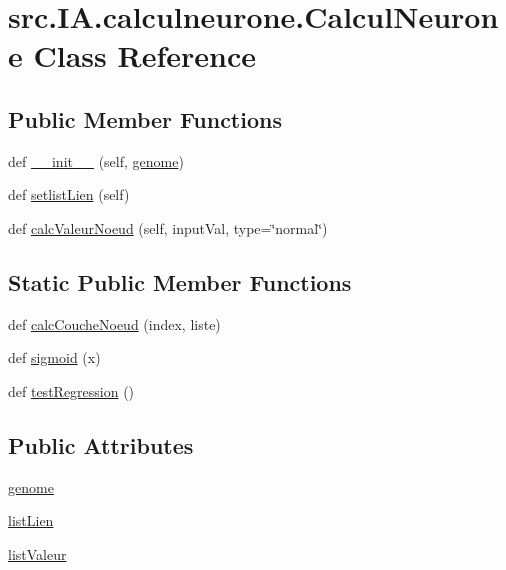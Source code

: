 \hypertarget{classsrc_1_1_i_a_1_1calculneurone_1_1_calcul_neurone}{}\section{src.\+I\+A.\+calculneurone.\+Calcul\+Neurone Class Reference}
\label{classsrc_1_1_i_a_1_1calculneurone_1_1_calcul_neurone}
\subsection*{Public Member Functions}
\begin{DoxyCompactItemize}
\item 
def \hyperlink{classsrc_1_1_i_a_1_1calculneurone_1_1_calcul_neurone_afe5ce9166d3419eb900db1d3a3801ba7}{\+\_\+\+\_\+init\+\_\+\+\_\+} (self, \hyperlink{classsrc_1_1_i_a_1_1calculneurone_1_1_calcul_neurone_a72f88c170dedc7b9fff3200986e5dafc}{genome})
\item 
def \hyperlink{classsrc_1_1_i_a_1_1calculneurone_1_1_calcul_neurone_a5a2eac40e09b30ac192f13c5486c54ad}{setlist\+Lien} (self)
\item 
def \hyperlink{classsrc_1_1_i_a_1_1calculneurone_1_1_calcul_neurone_a7d2ad74e3b969f02d7950313221fbe4a}{calc\+Valeur\+Noeud} (self, input\+Val, type=\char`\"{}normal\char`\"{})
\end{DoxyCompactItemize}
\subsection*{Static Public Member Functions}
\begin{DoxyCompactItemize}
\item 
def \hyperlink{classsrc_1_1_i_a_1_1calculneurone_1_1_calcul_neurone_a099b391595178f8212b417467aa066a9}{calc\+Couche\+Noeud} (index, liste)
\item 
def \hyperlink{classsrc_1_1_i_a_1_1calculneurone_1_1_calcul_neurone_a85f9c2a232514510494df22fad8076f3}{sigmoid} (x)
\item 
def \hyperlink{classsrc_1_1_i_a_1_1calculneurone_1_1_calcul_neurone_a06e27efe9cfd0bd879634946685299b5}{test\+Regression} ()
\end{DoxyCompactItemize}
\subsection*{Public Attributes}
\begin{DoxyCompactItemize}
\item 
\hyperlink{classsrc_1_1_i_a_1_1calculneurone_1_1_calcul_neurone_a72f88c170dedc7b9fff3200986e5dafc}{genome}
\item 
\hyperlink{classsrc_1_1_i_a_1_1calculneurone_1_1_calcul_neurone_a47ce8bc94af0536f22b9a55c7bf874d2}{list\+Lien}
\item 
\hyperlink{classsrc_1_1_i_a_1_1calculneurone_1_1_calcul_neurone_a4a217721543355649c6f25bbc50b6800}{list\+Valeur}
\end{DoxyCompactItemize}


